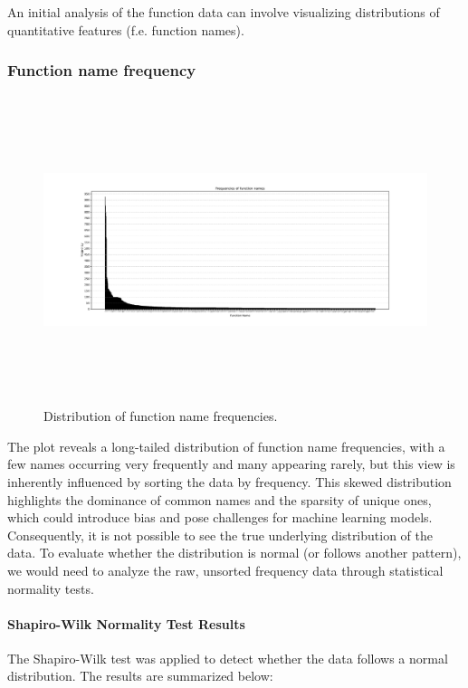 \documentclass[10pt,english,a4paper]{report}
\begin{document}
An initial analysis of the function data can involve visualizing distributions of quantitative features (f.e. function names).

\subsubsection{Function name frequency}
\begin{figure}[H]
    \centering
    \includegraphics[width=16cm, height=9cm]{figures/functionsASTs_merged_freq_histogram.pdf} 
    \caption{Distribution of function name frequencies.}
    \label{fig:func_freq_merged}
\end{figure}

The plot reveals a long-tailed distribution of function name frequencies, with a few names occurring very frequently and many appearing rarely, but this view is inherently influenced by sorting the data by frequency. This skewed distribution highlights the dominance of common names and the sparsity of unique ones, which could introduce bias and pose challenges for machine learning models. Consequently, it is not possible to see the true underlying distribution of the data. To evaluate whether the distribution is normal (or follows another pattern), we would need to analyze the raw, unsorted frequency data through statistical normality tests.

\paragraph{Shapiro-Wilk Normality Test Results}
The Shapiro-Wilk test was applied to detect whether the data follows a normal distribution. The results are summarized below:
\end{document}
